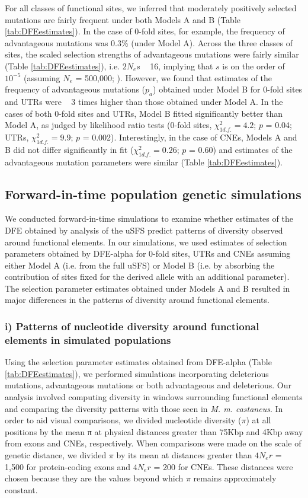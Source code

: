	For all classes of functional sites, we inferred that moderately positively selected mutations are fairly frequent under both Models A and B (Table \ref{tab:DFEestimates}). In the case of 0-fold sites, for example, the frequency of advantageous mutations was 0.3\% (under Model A). Across the three classes of sites, the scaled selection strengths of advantageous mutations were fairly similar (Table \ref{tab:DFEestimates}), i.e. $2N_es$ ~ 16, implying that $s$ is on the order of $10^{-5}$ (assuming $N_e$ = 500,000; \cite{RN315}). However, we found that estimates of the frequency of advantageous mutations ($p_a$) obtained under Model B for 0-fold sites and UTRs were ~ 3 times higher than those obtained under Model A. In the cases of both 0-fold sites and UTRs, Model B fitted significantly better than Model A, as judged by likelihood ratio tests (0-fold sites, $\chi^{2}_{1 d.f.} = 4.2$; $p$ = 0.04; UTRs, $\chi^{2}_{1 d.f.}= 9.9$; $p$ = 0.002). Interestingly, in the case of CNEs, Models A and B did not differ significantly in fit ($\chi^{2}_{1 d.f.} = 0.26$; $p$ = 0.60) and estimates of the advantageous mutation parameters were similar (Table \ref{tab:DFEestimates}). 

\subsection{Forward-in-time population genetic simulations}

        	We conducted forward-in-time simulations to examine whether estimates of the DFE obtained by analysis of the uSFS predict patterns of diversity observed around functional elements. In our simulations, we used estimates of selection parameters obtained by DFE-alpha for 0-fold sites, UTRs and CNEs assuming either Model A (i.e. from the full uSFS) or Model B (i.e. by absorbing the contribution of sites fixed for the derived allele with an additional parameter). The selection parameter estimates obtained under Models A and B resulted in major differences in the patterns of diversity around functional elements.

\subsubsection{i) Patterns of nucleotide diversity around functional elements in simulated populations}

	Using the selection parameter estimates obtained from DFE-alpha (Table \ref{tab:DFEestimates}), we performed simulations incorporating deleterious mutations, advantageous mutations or both advantageous and deleterious. Our analysis involved computing diversity in windows surrounding functional elements and comparing the diversity patterns with those seen in \textit{M. m. castaneus}. In order to aid visual comparisons, we divided nucleotide diversity ($\pi$) at all positions by the mean π at physical distances greater than 75Kbp and 4Kbp away from exons and CNEs, respectively. When comparisons were made on the scale of genetic distance, we divided $\pi$ by its mean at distances greater than $4N_er$ = 1,500 for protein-coding exons and $4N_er$ = 200 for CNEs. These distances were chosen because they are the values beyond which $\pi$ remains approximately constant. 


